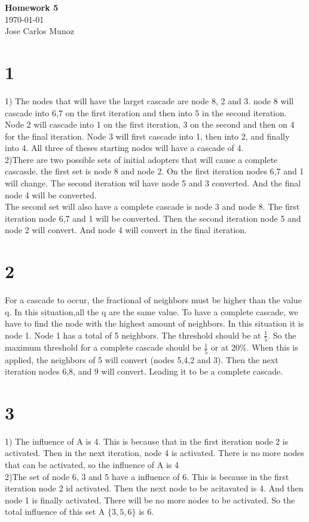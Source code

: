 \documentclass[12pt,english]{article}
\begin{document}
\begin{center}
    \Large
    \textbf{Homework 5}\\
    \small
    \today\\
    \large
    Jose Carlos Munoz
\end{center}
\section*{1}
1) The nodes that will have the larget cascade are node 8, 2 and 3. node 8 will cascade into 6,7 on the first iteration and then into 5 in the second iteration. Node 2 will cascade into 1 on the first iteration, 3 on the second and then on 4 for the final iteration. Node 3 will first cascade into 1, then into 2, and finally into 4. All three of theses starting nodes will have a cascade of 4.\\
2)There are two possible sets of initial adopters that will cause a complete cascasde. the first set is node 8 and node 2. On the first iteration nodes 6,7 and 1 will change. The second iteration wil have node 5 and 3 converted. And the final node 4 will be converted.\\
The second set will also have a complete cascade is node 3 and node 8. The first iteration node 6,7 and 1 will be converted. Then the second iteration node 5 and node 2 will convert. And node 4 will convert in the final iteration.
\section*{2}
For a cascade to occur, the fractional of neighbors must be higher than the value q. In this situation,all the q are the same value. To have a complete cascade, we have to find the node with the highest amount of neighbors. In this situation it is node 1. Node 1 has a total of 5 neighbors. The threshold should be at $\frac{1}{5}$. So the maximum threshold for a complete cascade should be $\frac{1}{5}$ or at 20\%. When this is applied, the neighbors of 5 will convert (nodes 5,4,2 and 3). Then the next iteration nodes 6,8, and 9 will convert. Leading it to be a complete cascade.
\section*{3}
1) The influence of A is 4. This is because that in the first iteration node 2 is activated. Then in the next iteration, node 4 is activated. There is no more nodes that can be activated, so the influence of A is 4\\
2)The set of node 6, 3 and 5 have a influence of 6. This is because in the first iteration node 2 id activated. Then the next node to be acitavated is 4. And then node 1 is finally activated. There will be no more nodes to be activated. So the total influence of this set A $\{3,5,6\}$ is 6.
\end{document}
